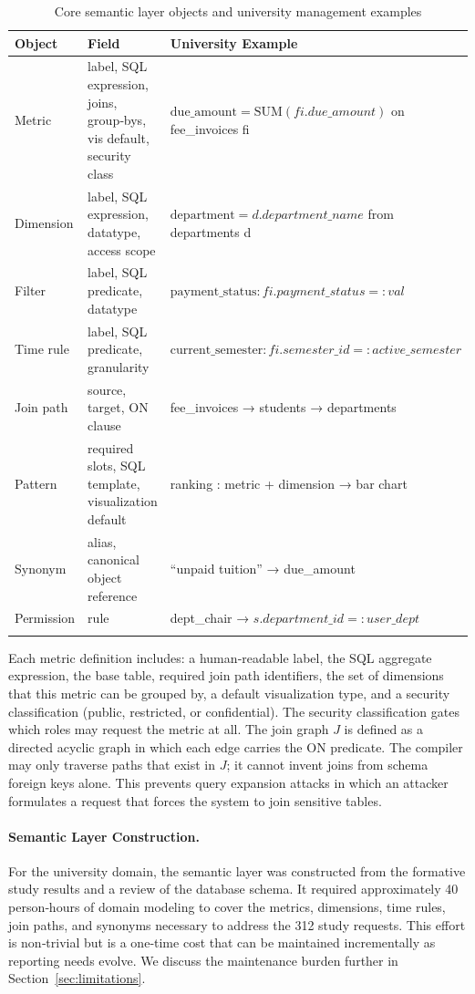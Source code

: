 \documentclass[11pt]{article}
\begin{document}
\begin{longtable}{lll}
\toprule
\textbf{Object} & \textbf{Field} & \textbf{University Example}\\
\midrule
Metric & label, SQL expression, joins, group‑bys, vis default, security class & $\mathrm{due\_amount} = \mathrm{SUM}(fi.due\_amount)$ on fee\_invoices fi\\
Dimension & label, SQL expression, datatype, access scope & $\mathrm{department} = d.department\_name$ from departments d\\
Filter & label, SQL predicate, datatype & $\mathrm{payment\_status} : fi.payment\_status = :val$\\
Time rule & label, SQL predicate, granularity & $\mathrm{current\_semester} : fi.semester\_id = :active\_semester$\\
Join path & source, target, ON clause & fee\_invoices → students → departments\\
Pattern & required slots, SQL template, visualization default & ranking : metric + dimension → bar chart\\
Synonym & alias, canonical object reference & ``unpaid tuition'' → due\_amount\\
Permission & rule & dept\_chair → $s.department\_id = :user\_dept$\\
\bottomrule
\caption{Core semantic layer objects and university management examples}\label{tab:semantic}
\end{longtable}

Each metric definition includes: a human‑readable label, the SQL aggregate expression, the base table, required join path identifiers, the set of dimensions that this metric can be grouped by, a default visualization type, and a security classification (public, restricted, or confidential). The security classification gates which roles may request the metric at all. The join graph $J$ is defined as a directed acyclic graph in which each edge carries the ON predicate. The compiler may only traverse paths that exist in $J$; it cannot invent joins from schema foreign keys alone. This prevents query expansion attacks in which an attacker formulates a request that forces the system to join sensitive tables.

\paragraph{Semantic Layer Construction.} For the university domain, the semantic layer was constructed from the formative study results and a review of the database schema. It required approximately 40 person‑hours of domain modeling to cover the metrics, dimensions, time rules, join paths, and synonyms necessary to address the 312 study requests. This effort is non‑trivial but is a one‑time cost that can be maintained incrementally as reporting needs evolve. We discuss the maintenance burden further in Section~\ref{sec:limitations}.
\end{document}
